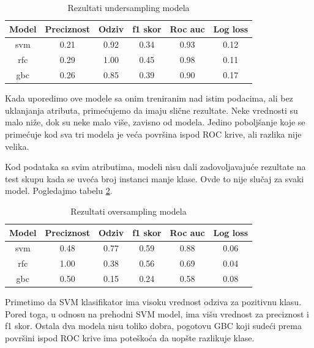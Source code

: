 \documentclass[a4paper]{article}
\begin{document}
\begin{table}[!h]
\begin{center}
\begin{tabular}{|c|c|c|c|c|c|} \hline
\textbf{Model} & \textbf{Preciznost} & \textbf{Odziv} & \textbf{f1 skor} & \textbf{Roc auc} & \textbf{Log loss} \\ \hline
svm & 0.21 & 0.92 & 0.34 & 0.93 & 0.12 \\ \hline
rfc & 0.29 & 1.00 & 0.45 & 0.98 & 0.11 \\ \hline
gbc & 0.26 & 0.85 & 0.39 & 0.90 & 0.17 \\ \hline
\end{tabular}
\caption{Rezultati undersampling modela}
\label{tab:undersampling_pg_simple}
\end{center}
\end{table}

Kada uporedimo ove modele sa onim treniranim nad istim podacima, ali bez
uklanjanja atributa, primećujemo da imaju slične rezultate. Neke vrednosti su
malo niže, dok su neke malo više, zavisno od modela. Jedino poboljšanje koje se primećuje kod sva tri modela je veća površina ispod ROC krive, ali razlika nije
velika.

Kod podataka sa svim atributima, modeli nisu dali zadovoljavajuće rezultate
na test skupu kada se uveća broj instanci manje klase. Ovde to nije slučaj za
svaki model. Pogledajmo tabelu \ref{tab:oversampling_pg_simple}.

\begin{table}[!h]
\begin{center}
\begin{tabular}{|c|c|c|c|c|c|} \hline
\textbf{Model} & \textbf{Preciznost} & \textbf{Odziv} & \textbf{f1 skor} & \textbf{Roc auc} & \textbf{Log loss} \\ \hline
svm & 0.48 & 0.77 & 0.59 & 0.88 & 0.06 \\ \hline
rfc & 1.00 & 0.38 & 0.56 & 0.69 & 0.04 \\ \hline
gbc & 0.50 & 0.15 & 0.24 & 0.58 & 0.08 \\ \hline
\end{tabular}
\caption{Rezultati oversampling modela}
\label{tab:oversampling_pg_simple}
\end{center}
\end{table}

Primetimo da SVM klasifikator ima visoku vrednost odziva za pozitivnu klasu. Pored toga, u odnosu na prehodni SVM model, ima višu vrednost za preciznost i f1 skor. Ostala dva modela nisu toliko dobra, pogotovu GBC koji sudeći prema površini ispod ROC krive ima poteškoća da uopšte razlikuje klase.
\end{document}
